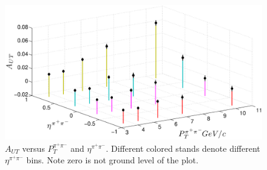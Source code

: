 \documentclass[abstract = on,listof=totoc, bibliography=totoc]{scrreprt}
\newcommand{\ptpair}{P_{T}^{\pi^+\pi^-}}
\newcommand{\etapair}{\eta^{\pi^+\pi^-}}
\begin{document}
\begin{figure}
\begin{center}
\includegraphics[width = 1\textwidth]{ptEtaLargeLabels2}
\caption[Asymmetry vs $\etapair$ and $\ptpair$ 2D binning]{$A_{UT}$ versus $\ptpair$ and $\etapair$. Different colored stands denote different $\etapair$ bins. Note zero is not ground level of the plot.}
\label{fig:2dEtaPt}
\end{center}
\end{figure}
\end{document}
